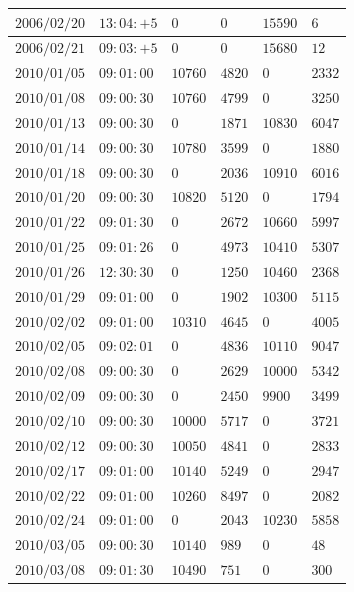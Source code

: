 \documentclass[a4j,papersize,disablejfam,slide,14pt]{jsarticle}
\begin{document}
\begin{description}
\begin{center}
\begin{longtable}{|l|l|l|l|l|l|}
					$2006/02/20$ & $13:04:+5$  & $0$ & $0$ & $15590$ & $6$ \\ \hline
					$2006/02/21$ & $09:03:+5$  & $0$ & $0$ & $15680$ & $12$ \\ \hline
					$2010/01/05$ & $09:01:00$  & $10760$ & $4820$ & $0$ & $2332$ \\ \hline
					$2010/01/08$ & $09:00:30$  & $10760$ & $4799$ & $0$ & $3250$ \\ \hline
					$2010/01/13$ & $09:00:30$  & $0$ & $1871$ & $10830$ & $6047$ \\ \hline
					$2010/01/14$ & $09:00:30$  & $10780$ & $3599$ & $0$ & $1880$ \\ \hline
					$2010/01/18$ & $09:00:30$  & $0$ & $2036$ & $10910$ & $6016$ \\ \hline
					$2010/01/20$ & $09:00:30$  & $10820$ & $5120$ & $0$ & $1794$ \\ \hline
					$2010/01/22$ & $09:01:30$  & $0$ & $2672$ & $10660$ & $5997$ \\ \hline
					$2010/01/25$ & $09:01:26$  & $0$ & $4973$ & $10410$ & $5307$ \\ \hline
					$2010/01/26$ & $12:30:30$  & $0$ & $1250$ & $10460$ & $2368$ \\ \hline
					$2010/01/29$ & $09:01:00$  & $0$ & $1902$ & $10300$ & $5115$ \\ \hline
					$2010/02/02$ & $09:01:00$  & $10310$ & $4645$ & $0$ & $4005$ \\ \hline
					$2010/02/05$ & $09:02:01$  & $0$ & $4836$ & $10110$ & $9047$ \\ \hline
					$2010/02/08$ & $09:00:30$  & $0$ & $2629$ & $10000$ & $5342$ \\ \hline
					$2010/02/09$ & $09:00:30$  & $0$ & $2450$ & $9900$ & $3499$ \\ \hline
					$2010/02/10$ & $09:00:30$  & $10000$ & $5717$ & $0$ & $3721$ \\ \hline
					$2010/02/12$ & $09:00:30$  & $10050$ & $4841$ & $0$ & $2833$ \\ \hline
					$2010/02/17$ & $09:01:00$  & $10140$ & $5249$ & $0$ & $2947$ \\ \hline
					$2010/02/22$ & $09:01:00$  & $10260$ & $8497$ & $0$ & $2082$ \\ \hline
					$2010/02/24$ & $09:01:00$  & $0$ & $2043$ & $10230$ & $5858$ \\ \hline
					$2010/03/05$ & $09:00:30$  & $10140$ & $989$ & $0$ & $48$ \\ \hline
					$2010/03/08$ & $09:01:30$  & $10490$ & $751$ & $0$ & $300$ \\ \hline

\end{longtable}
\end{center}
\end{description}
\end{document}
